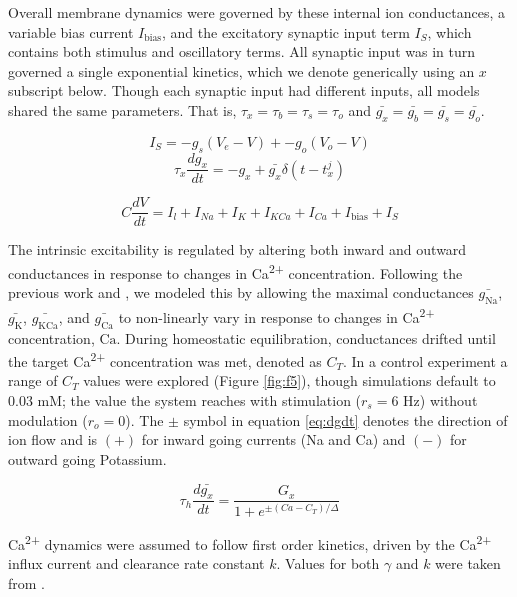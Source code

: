 \documentclass{article}
\begin{document}
Overall membrane dynamics were governed by these internal ion conductances, a variable bias current $I_\text{bias}$, and the excitatory synaptic input term $I_S$, which contains both stimulus and oscillatory terms. All synaptic input was in turn governed a single exponential kinetics, which we denote generically using an $x$ subscript below. Though each synaptic input had different inputs, all models shared the same parameters. That is, $\tau_x = \tau_b = \tau_s = \tau_o$ and $\bar{g_x} = \bar{g_b} = \bar{g_s} = \bar{g_o}$.

\begin{equation}
    I_S = -g_s (V_e - V) + -g_o (V_o - V) 
\end{equation}
\begin{equation}
    \tau_x \frac{dg_x}{dt} = -g_x + \bar{g_x} \delta(t - t_x^j)
\end{equation}

\begin{equation}
\label{eq:HHH}
C \frac{dV}{dt} = I_l + I_{Na} + I_{K} + I_{KCa} + I_{Ca} + I_{\text{bias}} + I_{S} 
\end{equation}

The intrinsic excitability is regulated by altering both inward and outward conductances in response to changes in Ca\textsuperscript{2+} concentration. Following the previous work \cite{LeMasson1993} and \cite{Siegel1994}, we modeled this by allowing the maximal conductances $\bar{g_\text{Na}}$, $\bar{g_\text{K}}$, $\bar{g_\text{KCa}}$, and $\bar{g_\text{Ca}}$ to non-linearly vary in response to changes in Ca\textsuperscript{2+} concentration, $\text{Ca}$. During homeostatic equilibration, conductances drifted until the target Ca\textsuperscript{2+} concentration was met, denoted as $C_T$. In a control experiment a range of $C_T$ values were explored (Figure \ref{fig:f5}), though simulations default to 0.03 mM; the value the system reaches with stimulation ($r_s = 6$ Hz) without modulation ($r_o = 0$). The $\pm$ symbol in equation \ref{eq:dgdt} denotes the direction of ion flow and is $(+)$ for inward going currents (Na and Ca) and $(-)$ for outward going Potassium.

\begin{equation}
\label{eq:dgdt}
\tau_h \frac{d \bar{g_x}}{dt} = \frac{G_x}{1 + e^{\pm (Ca - C_T)/\Delta}}
\end{equation}

Ca\textsuperscript{2+} dynamics were assumed to follow first order kinetics, driven by the Ca\textsuperscript{2+} influx current and clearance rate constant $k$. Values for both $\gamma$ and $k$ were taken from \cite{Liu1998}.
\end{document}
